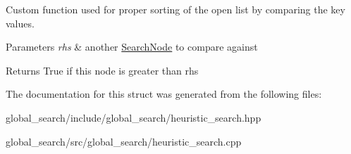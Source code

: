 Custom function used for proper sorting of the open list by comparing the key values. 


\begin{DoxyParams}{Parameters}
{\em rhs} & another \hyperlink{structhsearch_1_1SearchNode}{Search\+Node} to compare against \\
\hline
\end{DoxyParams}
\begin{DoxyReturn}{Returns}
True if this node is greater than rhs 
\end{DoxyReturn}


The documentation for this struct was generated from the following files\+:\begin{DoxyCompactItemize}
\item 
global\+\_\+search/include/global\+\_\+search/heuristic\+\_\+search.\+hpp\item 
global\+\_\+search/src/global\+\_\+search/heuristic\+\_\+search.\+cpp\end{DoxyCompactItemize}
